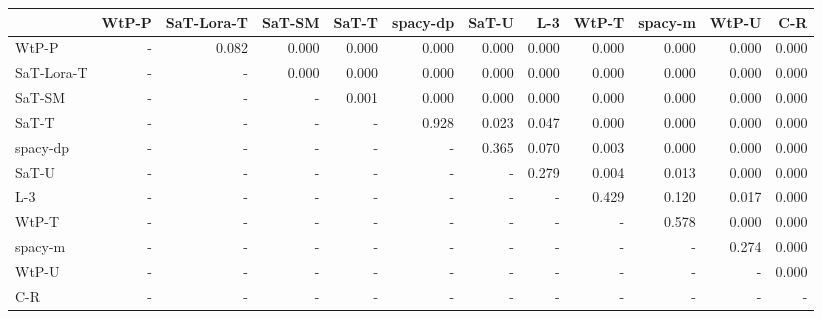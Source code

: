 \begin{tabular}{lrrrrrrrrrrr}
\toprule
 & WtP-P & SaT-Lora-T & SaT-SM & SaT-T & spacy-dp & SaT-U & L-3 & WtP-T & spacy-m & WtP-U & C-R \\
\midrule
WtP-P & - & 0.082 & 0.000 & 0.000 & 0.000 & 0.000 & 0.000 & 0.000 & 0.000 & 0.000 & 0.000 \\
SaT-Lora-T & - & - & 0.000 & 0.000 & 0.000 & 0.000 & 0.000 & 0.000 & 0.000 & 0.000 & 0.000 \\
SaT-SM & - & - & - & 0.001 & 0.000 & 0.000 & 0.000 & 0.000 & 0.000 & 0.000 & 0.000 \\
SaT-T & - & - & - & - & 0.928 & 0.023 & 0.047 & 0.000 & 0.000 & 0.000 & 0.000 \\
spacy-dp & - & - & - & - & - & 0.365 & 0.070 & 0.003 & 0.000 & 0.000 & 0.000 \\
SaT-U & - & - & - & - & - & - & 0.279 & 0.004 & 0.013 & 0.000 & 0.000 \\
L-3 & - & - & - & - & - & - & - & 0.429 & 0.120 & 0.017 & 0.000 \\
WtP-T & - & - & - & - & - & - & - & - & 0.578 & 0.000 & 0.000 \\
spacy-m & - & - & - & - & - & - & - & - & - & 0.274 & 0.000 \\
WtP-U & - & - & - & - & - & - & - & - & - & - & 0.000 \\
C-R & - & - & - & - & - & - & - & - & - & - & - \\
\bottomrule
\end{tabular}

